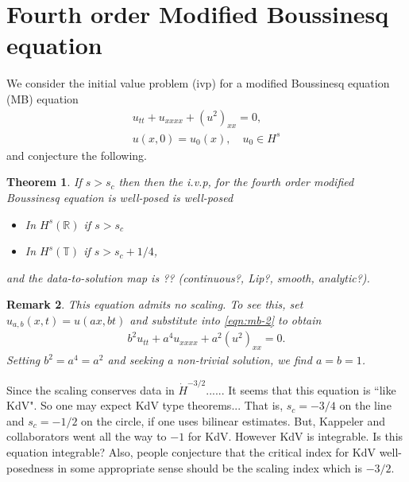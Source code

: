 \documentclass[12pt,reqno]{amsart}
\numberwithin{equation}{section}  %
\numberwithin{figure}{section}
\newcommand{\rr}{\mathbb{R}}
\newcommand{\ci}{\mathbb{T}}
\newtheorem{theorem}{Theorem}[section]
\newtheorem{remark}[theorem]{Remark}
\begin{document}
%
\section{Fourth order Modified Boussinesq  equation}
\label{sec:intro-2}
We consider the initial value problem (ivp) for a modified Boussinesq
equation (MB) equation 
\begin{gather}
  u_{tt}   + u_{xxxx} + (u^2)_{xx} = 0,
  \label{eqn:mb-2}
  \\
  u(x,0) = u_{0}(x), \quad u_{0} \in H^{s}
  \label{eqn:mb-init-data-2}
\end{gather}
and conjecture the following.
%
%
%
%
%
%
%
%
\begin{theorem}
  If $s>s_c$ then 
  then the  i.v.p, for the fourth order modified Boussinesq  equation  is well-posed
  is well-posed 
  \begin{itemize}
    \item In $H^s(\rr)$ if $s > s_c$
    \item In $H^{s}(\ci)$ if $s > s_c + 1/4$,
  \end{itemize}
  and the data-to-solution map is  ?? (continuous?, Lip?, smooth, analytic?). 
  \label{thm:wp-2}
\end{theorem}
%

%
%
\begin{framed}
\begin{remark}
  This equation admits no scaling. To see this, set $u_{a,b}(x,t) =
  u(ax,bt)$ and substitute into \eqref{eqn:mb-2} to obtain
  \begin{equation*}
    \begin{split}
      b^{2}u_{tt} + a^{4}u_{xxxx} + a^{2}(u^{2})_{xx} = 0.
    \end{split}
  \end{equation*}
  Setting $b^{2} = a^{4} = a^{2}$ and seeking a non-trivial solution, we
  find $a=b=1$. 
  \label{rem:scaling}
\end{remark}
\end{framed}
%
%
Since the scaling conserves data in $\dot{H}^{-3/2}$......
It seems that this equation is ``like KdV".
So one may expect KdV type theorems...
That is, $s_c=-3/4$ on the line and $s_c=-1/2$ on the circle,
if one uses bilinear estimates.
But, Kappeler and collaborators went all the way to $-1$ for KdV.
However KdV is integrable. Is this equation integrable?
Also, people conjecture that the critical index for KdV well-posedness 
in some appropriate sense should be the scaling index which is  $-3/2$.
\end{document}
